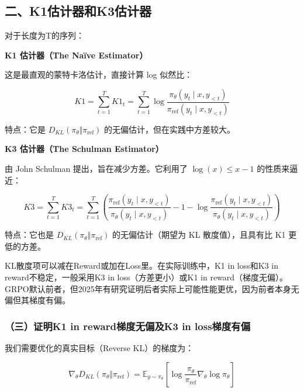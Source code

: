 \hypertarget{ux4e8ck1ux4f30ux8ba1ux5668ux548ck3ux4f30ux8ba1ux5668}{%
\subsection{二、K1估计器和K3估计器}\label{ux4e8ck1ux4f30ux8ba1ux5668ux548ck3ux4f30ux8ba1ux5668}}

对于长度为T的序列：

\textbf{K1 估计器（The Naïve Estimator）}

这是最直观的蒙特卡洛估计，直接计算 log 似然比：

\[
K1=\sum_{t=1}^{T}K1_t
=\sum_{t=1}^{T}\log\frac{\pi_\theta(y_t\mid x,y_{<t})}{\pi_{\mathrm{ref}}(y_t\mid x,y_{<t})}
\]

特点：它是 \(D_{KL}(\pi_\theta \Vert \pi_{\mathrm{ref}})\) 的无偏估计，但在实践中方差较大。

\textbf{K3 估计器（The Schulman Estimator）}

由 John Schulman 提出，旨在减少方差。它利用了 \(\log(x)\le x-1\) 的性质来逼近：

\[
K3=\sum_{t=1}^{T}K3_t
=\sum_{t=1}^{T}\left(
\frac{\pi_{\mathrm{ref}}(y_t\mid x,y_{<t})}{\pi_\theta(y_t\mid x,y_{<t})}
-1
-\log\frac{\pi_{\mathrm{ref}}(y_t\mid x,y_{<t})}{\pi_\theta(y_t\mid x,y_{<t})}
\right)
\]

特点：它也是 \(D_{KL}(\pi_\theta \Vert \pi_{\mathrm{ref}})\) 的无偏估计（期望为 KL 散度值），且具有比 K1 更低的方差。

KL散度项可以减在Reward或加在Loss里。在实际训练中，K1 in loss和K3 in reward不稳定，一般采用K3 in loss（方差更小）或K1 in reward（梯度无偏）。GRPO默认前者，但2025年有研究证明后者实际上可能性能更优，因为前者本身无偏但其梯度有偏。

\hypertarget{ux4e09ux8bc1ux660ek1-in-rewardux68afux5ea6ux65e0ux504fux53cak3-in-lossux68afux5ea6ux6709ux504f}{%
\subsubsection{（三）证明K1 in reward梯度无偏及K3 in loss梯度有偏}\label{ux4e09ux8bc1ux660ek1-in-rewardux68afux5ea6ux65e0ux504fux53cak3-in-lossux68afux5ea6ux6709ux504f}}

我们需要优化的真实目标（Reverse KL）的梯度为：

\[
\nabla_\theta D_{KL}(\pi_\theta \Vert \pi_{\mathrm{ref}})
=\mathbb{E}_{y\sim\pi_\theta}\left[
\log\frac{\pi_\theta}{\pi_{\mathrm{ref}}}\nabla_\theta\log\pi_\theta
\right]
\]


